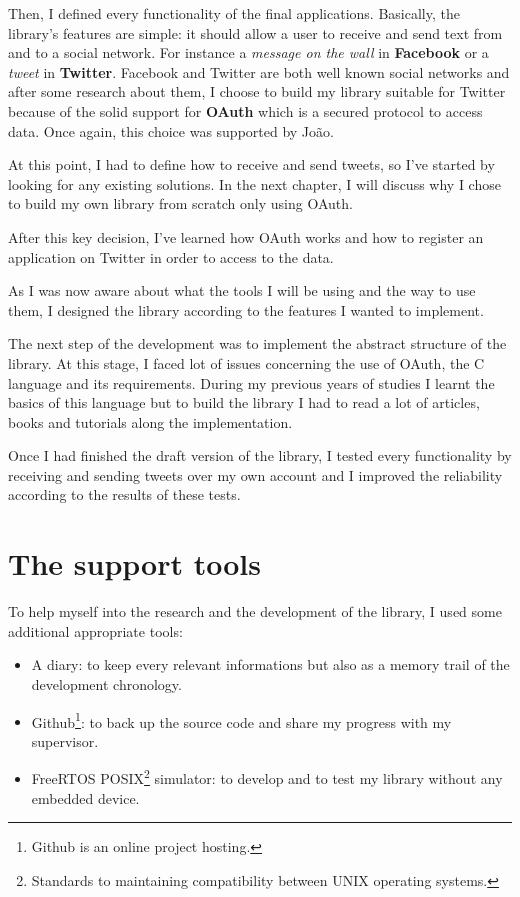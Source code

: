 Then, I defined every functionality of the final applications. Basically, the library's features are simple: it should allow a user to receive and send text from and to a social network. For instance a \textit{message on the wall} in \textbf{Facebook} or a \textit{tweet} in \textbf{Twitter}. Facebook and Twitter are both well known social networks and after some research about them, I choose to build my library suitable for Twitter because of the solid support for \textbf{OAuth} which is a secured protocol to access data. Once again, this choice was supported by Jo\~{a}o.

At this point, I had to define how to receive and send tweets, so I've started by looking for any existing solutions. In the next chapter, I will discuss why I chose to build my own library from scratch only using OAuth.

After this key decision, I've learned how OAuth works and how to register an application on Twitter in order to access to the data.

As I was now aware about what the tools I will be using and the way to use them, I designed the library according to the features I wanted to implement.

The next step of the development was to implement the abstract structure of the library. At this stage, I faced lot of issues concerning the use of OAuth, the C language and its requirements. During my previous years of studies I learnt the basics of this language but to build the library I had to read a lot of articles, books and tutorials along the implementation.

Once I had finished the draft version of the library, I tested every functionality by receiving and sending tweets over my own account and I improved the reliability according to the results of these tests.



\section{The support tools}

\hspace{15mm}To help myself into the research and the development of the library, I used some additional appropriate tools:
\begin{itemize}
\item A diary: to keep every relevant informations but also as a memory trail of the development chronology.
\item Github\footnote{Github is an online project hosting.}: to back up the source code and share my progress with my supervisor.
\item FreeRTOS POSIX\footnote{Standards to maintaining compatibility between UNIX operating systems.} simulator: to develop and to test my library without any embedded device.
\end{itemize}

\clearpage
